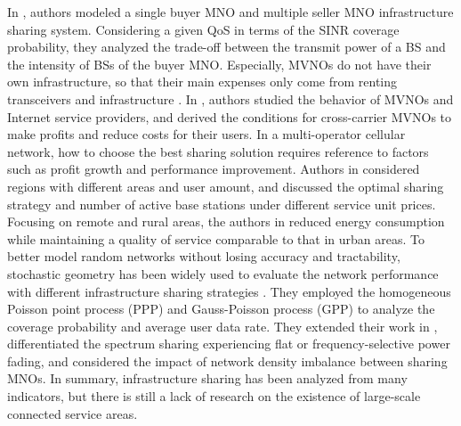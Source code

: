 \documentclass[final]{IEEEtran}
\begin{document}
In \cite{8329530}, authors modeled a single buyer MNO and multiple seller MNO infrastructure sharing system. Considering a given QoS in terms of the SINR coverage probability, they analyzed the trade-off between the transmit power of a BS and the intensity of BSs of the buyer MNO. Especially, MVNOs do not have their own infrastructure, so that their main expenses only come from renting transceivers and infrastructure \cite{7105671}. In \cite{zheng2017economic}, authors studied the behavior of MVNOs and Internet service providers, and derived the conditions for cross-carrier MVNOs to make profits and reduce costs for their users.
In a multi-operator cellular network, how to choose the best sharing solution requires reference to factors such as profit growth and performance improvement. Authors in \cite{cano2017optimal} considered regions with different areas and user amount, and discussed the optimal sharing strategy and number of active base stations under different service unit prices. Focusing on remote and rural areas, the authors in \cite{dlamini2021remote} reduced energy consumption while maintaining a quality of service comparable to that in urban areas. To better model random networks without losing accuracy and tractability, stochastic geometry has been widely used to evaluate the network performance with different infrastructure sharing strategies \cite{hmamouche2021new}.
They employed the homogeneous Poisson point process (PPP) and Gauss-Poisson process (GPP) to analyze the coverage probability and average user data rate. They extended their work in \cite{7876864}, differentiated the spectrum sharing experiencing flat or frequency-selective power fading, and considered the impact of network density imbalance between sharing MNOs. In summary, infrastructure sharing has been analyzed from many indicators, but there is still a lack of research on the existence of large-scale connected service areas.
\end{document}
